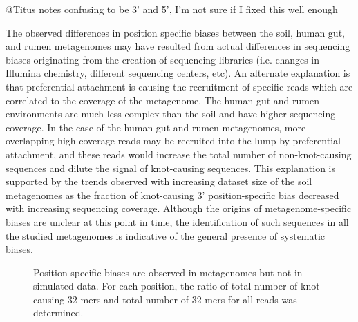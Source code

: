 \documentclass[11pt]{article} %
\begin{document}
@Titus notes confusing to be 3' and 5', I'm not sure if I fixed this well enough

The observed differences in position specific biases between the soil, human gut, and rumen metagenomes may have resulted from actual differences in sequencing biases originating from the creation of sequencing libraries (i.e. changes in Illumina chemistry, different sequencing centers, etc).  An alternate explanation is that preferential attachment is causing the recruitment of specific reads which are correlated to the coverage of the metagenome.  The human gut and rumen environments are much less complex than the soil and have higher sequencing coverage.  In the case of the human gut and rumen metagenomes, more overlapping high-coverage reads may be recruited into the lump by preferential attachment, and these reads would increase the total number of non-knot-causing sequences and dilute the signal of knot-causing sequences.  This explanation is supported by the trends observed with increasing dataset size of the soil metagenomes as the fraction of knot-causing 3' position-specific bias decreased with increasing sequencing coverage.  Although the origins of metagenome-specific biases are unclear at this point in time, the identification of such sequences in all the studied metagenomes is indicative of the general presence of systematic biases.

\begin{figure}
\caption{Position specific biases are observed in metagenomes but not in simulated data.  For each position, the ratio of total number of knot-causing 32-mers and total number of 32-mers for all reads was determined.}
\end{figure}
\end{document}
